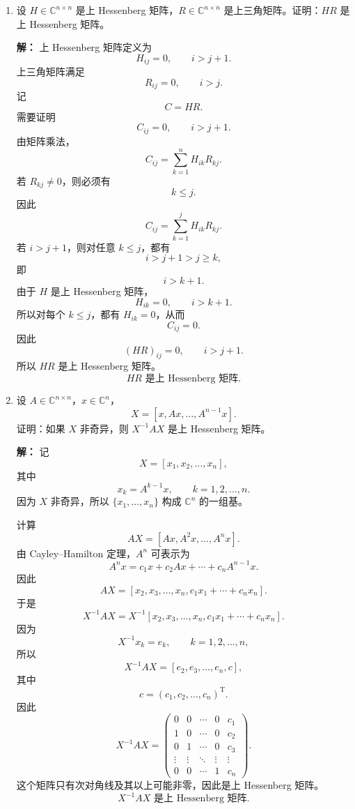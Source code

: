 \documentclass[11pt]{article}
\newcommand{\C}{\mathbb{C}}
\renewcommand{\top}{\mathrm{T}}
\newenvironment{solution}{\par\noindent\textbf{解：}}{\par}
\begin{document}
\begin{enumerate}
\begin{solution}
因此算法为：
\[
\boxed{
\text{对 }k=1,2,\dots,n,\text{ 用 Householder 变换消去第 }k\text{ 列第 }k+1,\dots,m\text{ 行元素。}
}
\]
\end{solution}

\item 设 \(H\in\C^{n\times n}\) 是上 Hessenberg 矩阵，\(R\in\C^{n\times n}\) 是上三角矩阵。证明：\(HR\) 是上 Hessenberg 矩阵。

\begin{solution}
上 Hessenberg 矩阵定义为
\[
H_{ij}=0,\qquad i>j+1.
\]
上三角矩阵满足
\[
R_{ij}=0,\qquad i>j.
\]
记
\[
C=HR.
\]
需要证明
\[
C_{ij}=0,\qquad i>j+1.
\]
由矩阵乘法，
\[
C_{ij}=\sum_{k=1}^n H_{ik}R_{kj}.
\]
若 \(R_{kj}\neq 0\)，则必须有
\[
k\leqslant j.
\]
因此
\[
C_{ij}=\sum_{k=1}^{j} H_{ik}R_{kj}.
\]
若 \(i>j+1\)，则对任意 \(k\leqslant j\)，都有
\[
i>j+1>j\geqslant k,
\]
即
\[
i>k+1.
\]
由于 \(H\) 是上 Hessenberg 矩阵，
\[
H_{ik}=0,\qquad i>k+1.
\]
所以对每个 \(k\leqslant j\)，都有 \(H_{ik}=0\)，从而
\[
C_{ij}=0.
\]
因此
\[
(HR)_{ij}=0,\qquad i>j+1.
\]
所以 \(HR\) 是上 Hessenberg 矩阵。
\[
\boxed{HR\text{ 是上 Hessenberg 矩阵}.}
\]
\end{solution}

\item 设 \(A\in\C^{n\times n}\)，\(x\in\C^n\)，
\[
X=[x,Ax,\dots,A^{n-1}x].
\]
证明：如果 \(X\) 非奇异，则 \(X^{-1}AX\) 是上 Hessenberg 矩阵。

\begin{solution}
记
\[
X=[x_1,x_2,\dots,x_n],
\]
其中
\[
x_k=A^{k-1}x,\qquad k=1,2,\dots,n.
\]
因为 \(X\) 非奇异，所以 \(\{x_1,\dots,x_n\}\) 构成 \(\C^n\) 的一组基。

计算
\[
AX=[Ax,A^2x,\dots,A^nx].
\]
由 Cayley--Hamilton 定理，\(A^n\) 可表示为
\[
A^nx=c_1x+c_2Ax+\cdots+c_nA^{n-1}x.
\]
因此
\[
AX=[x_2,x_3,\dots,x_n,c_1x_1+\cdots+c_nx_n].
\]
于是
\[
X^{-1}AX
=
X^{-1}[x_2,x_3,\dots,x_n,c_1x_1+\cdots+c_nx_n].
\]
因为
\[
X^{-1}x_k=e_k,\qquad k=1,2,\dots,n,
\]
所以
\[
X^{-1}AX
=
[e_2,e_3,\dots,e_n,c],
\]
其中
\[
c=(c_1,c_2,\dots,c_n)^{\top}.
\]
因此
\[
X^{-1}AX=
\begin{pmatrix}
0&0&\cdots&0&c_1\\
1&0&\cdots&0&c_2\\
0&1&\cdots&0&c_3\\
\vdots&\vdots&\ddots&\vdots&\vdots\\
0&0&\cdots&1&c_n
\end{pmatrix}.
\]
这个矩阵只有次对角线及其以上可能非零，因此是上 Hessenberg 矩阵。
\[
\boxed{X^{-1}AX\text{ 是上 Hessenberg 矩阵}.}
\]
\end{solution}


\end{enumerate}
\end{document}
